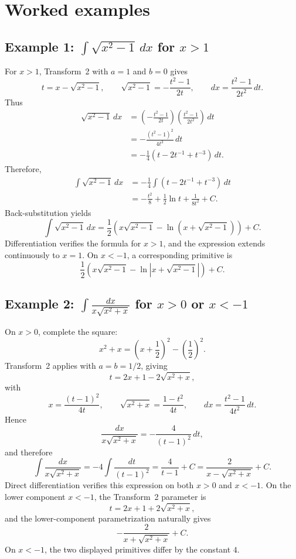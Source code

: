 \documentclass[11pt]{article}
\theoremstyle{remark}
\begin{document}
\section{Worked examples}

\subsection*{Example 1: $\displaystyle\int\sqrt{x^2-1}\,dx$ for $x>1$}

For $x>1$, Transform~2 with $a=1$ and $b=0$ gives
\[
t=x-\sqrt{x^2-1},
\qquad
\sqrt{x^2-1}=-\frac{t^2-1}{2t},
\qquad
dx=\frac{t^2-1}{2t^2}\,dt.
\]
Thus
\begin{align*}
\sqrt{x^2-1}\,dx
&=\left(-\frac{t^2-1}{2t}\right)\left(\frac{t^2-1}{2t^2}\right)\,dt\\
&=-\frac{(t^2-1)^2}{4t^3}\,dt\\
&=-\frac{1}{4}\left(t-2t^{-1}+t^{-3}\right)\,dt.
\end{align*}
Therefore,
\begin{align*}
\int\sqrt{x^2-1}\,dx
&=-\frac{1}{4}\int\left(t-2t^{-1}+t^{-3}\right)\,dt\\
&=-\frac{t^2}{8}+\frac{1}{2}\ln t+\frac{1}{8t^2}+C.
\end{align*}
Back-substitution yields
\[
\int\sqrt{x^2-1}\,dx
=\frac{1}{2}\left(x\sqrt{x^2-1}-\ln\!\left(x+\sqrt{x^2-1}\right)\right)+C.
\]
Differentiation verifies the formula for $x>1$, and the expression extends continuously to $x=1$. On $x<-1$, a corresponding primitive is
\[
\frac{1}{2}\left(x\sqrt{x^2-1}-\ln\left|x+\sqrt{x^2-1}\right|\right)+C.
\]

\subsection*{Example 2: $\displaystyle\int\frac{dx}{x\sqrt{x^2+x}}$ for $x>0$ or $x<-1$}

On $x>0$, complete the square:
\[
x^2+x=\left(x+\frac{1}{2}\right)^2-\left(\frac{1}{2}\right)^2.
\]
Transform~2 applies with $a=b=1/2$, giving
\[
t=2x+1-2\sqrt{x^2+x},
\]
with
\[
x=\frac{(t-1)^2}{4t},
\qquad
\sqrt{x^2+x}=\frac{1-t^2}{4t},
\qquad
dx=\frac{t^2-1}{4t^2}\,dt.
\]
Hence
\[
\frac{dx}{x\sqrt{x^2+x}}
=-\frac{4}{(t-1)^2}\,dt,
\]
and therefore
\[
\int\frac{dx}{x\sqrt{x^2+x}}
=-4\int\frac{dt}{(t-1)^2}
=\frac{4}{t-1}+C
=\frac{2}{x-\sqrt{x^2+x}}+C.
\]
Direct differentiation verifies this expression on both $x>0$ and $x<-1$. On the lower component $x<-1$, the Transform~2 parameter is
\[
t=2x+1+2\sqrt{x^2+x},
\]
and the lower-component parametrization naturally gives
\[
-\frac{2}{x+\sqrt{x^2+x}}+C.
\]
On $x<-1$, the two displayed primitives differ by the constant $4$.
\end{document}
